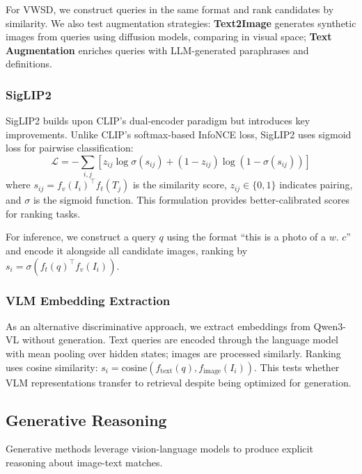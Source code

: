 \documentclass[11pt]{article}
\begin{document}
For VWSD, we construct queries in the same format and rank candidates by similarity. We also test augmentation strategies: \textbf{Text2Image} generates synthetic images from queries using diffusion models, comparing in visual space; \textbf{Text Augmentation} enriches queries with LLM-generated paraphrases and definitions.

\subsubsection{SigLIP2}

SigLIP2 \cite{zhai2023siglip} builds upon CLIP's dual-encoder paradigm but introduces key improvements. Unlike CLIP's softmax-based InfoNCE loss, SigLIP2 uses sigmoid loss for pairwise classification:
\begin{equation}
\mathcal{L} = -\sum_{i,j} \left[ z_{ij} \log \sigma(s_{ij}) + (1-z_{ij}) \log (1 - \sigma(s_{ij})) \right]
\end{equation}
where $s_{ij} = f_v(I_i)^\top f_t(T_j)$ is the similarity score, $z_{ij} \in \{0, 1\}$ indicates pairing, and $\sigma$ is the sigmoid function. This formulation provides better-calibrated scores for ranking tasks.

For inference, we construct a query $q$ using the format ``this is a photo of a $w$. $c$'' and encode it alongside all candidate images, ranking by $s_i = \sigma(f_t(q)^\top f_v(I_i))$.

\subsubsection{VLM Embedding Extraction}

As an alternative discriminative approach, we extract embeddings from Qwen3-VL \cite{yang2025qwen3} without generation. Text queries are encoded through the language model with mean pooling over hidden states; images are processed similarly. Ranking uses cosine similarity: $s_i = \text{cosine}(f_{\text{text}}(q), f_{\text{image}}(I_i))$. This tests whether VLM representations transfer to retrieval despite being optimized for generation.

\subsection{Generative Reasoning}

Generative methods leverage vision-language models to produce explicit reasoning about image-text matches.
\end{document}
